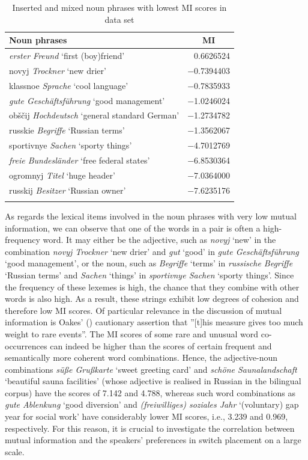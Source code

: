 \begin{table}
		\begin{tabular}{lr}
		    \lsptoprule
			Noun phrases	& \multicolumn{1}{c}{MI} \\ \midrule
			\textit{erster Freund}	`first (boy)friend' &0.6626524\\
			novyj \textit{Trockner} `new drier'		&−0.7394403\\
			klassnoe \textit{Sprache} `cool language' 	&−0.7835933\\
			\textit{gute Geschäftsführung} `good management'	&−1.0246024\\
			obščij \textit{Hochdeutsch}	 `general standard German'	&−1.2734782\\
			russkie \textit{Begriffe} `Russian terms'	&−1.3562067\\
			sportivnye \textit{Sachen} `sporty things'	&−4.7012769\\
			\textit{freie Bundesländer} `free federal states' &−6.8530364\\
			ogromnyj \textit{Titel}	 `huge header'	&−7.0364000\\
			russkij \textit{Besitzer} `Russian owner'	&−7.6235176\\
			\lspbottomrule 
		\end{tabular}
\caption{Inserted and mixed noun phrases with lowest MI scores in data set\label{tab:4:10}}
\end{table}

As regards the lexical items involved in the noun phrases with very low mutual information, we can observe that one of the words in a pair is often a high-frequency word. It may either be the adjective, such as \textit{novyj} `new' in the combination \textit{novyj Trockner} `new drier' and \textit{gut} `good' in \textit{gute Geschäftsführung} `good management', or the noun, such as \textit{Begriffe} `terms' in \textit{russische Begriffe} `Russian terms' and \textit{Sachen} `things' in \textit{sportivnye Sachen} `sporty things'. Since the frequency of these lexemes is high, the chance that they combine with other words is also high. As a result, these strings exhibit low degrees of cohesion and therefore low MI scores. Of particular relevance in the discussion of mutual information is Oakes' (\citeyear[][171]{oakes-1998}) cautionary assertion that ''[t]his measure gives too much weight to rare events''. The MI scores of some rare and unusual word co-occurrences can indeed be higher than the scores of certain frequent and semantically more coherent word combinations. Hence, the adjective-noun combinations \textit{süße Grußkarte} `sweet greeting card' and \textit{schöne Saunalandschaft} `beautiful sauna facilities' (whose adjective is realised in Russian in the bilingual corpus) have the scores of 7.142 and 4.788, whereas such word combinations as \textit{gute Ablenkung} `good diversion' and \textit{(freiwilliges) soziales Jahr} `(voluntary) gap year for social work' have considerably lower MI scores, i.e., 3.239 and 0.969, respectively. For this reason, it is crucial to investigate the correlation between mutual information and the speakers' preferences in switch placement on a large scale.

